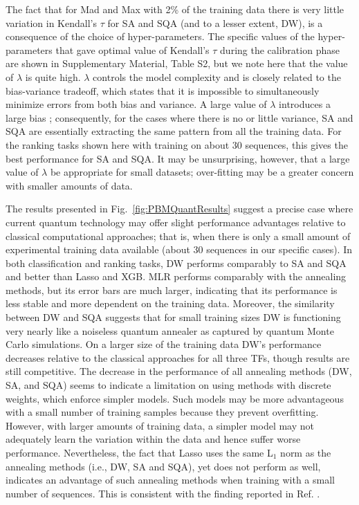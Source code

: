 \documentclass[aps,pra,groupedaddress,nofootinbib,notitlepage,showpacs,floatfix,superscriptaddress]{revtex4-1}
\begin{document}
The fact that for Mad and Max with 2\% of the training data there is very little variation in Kendall's $\tau$ for SA and SQA (and to a lesser extent, DW), is a consequence of the choice of hyper-parameters. The specific values of the hyper-parameters {that gave optimal value of Kendall's $\tau$ during the calibration phase} are shown in Supplementary Material, Table S2, but we note here that the value of $\lambda$ is quite high. $\lambda$ controls the model complexity and is closely related to the bias-variance tradeoff, which states that it is impossible to simultaneously minimize errors from both bias and variance. A large value of $\lambda$ introduces a large bias \cite{Cucker:02}; consequently, for the cases where there is no or little variance, SA and SQA are essentially extracting the same pattern from all the training data. For the ranking tasks shown here with training on about $30$ sequences, this gives the best performance for SA and SQA. It may be unsurprising, however, that a large value of $\lambda$ be appropriate for small datasets; over-fitting may be a greater concern with smaller amounts of data. 

The results presented in Fig.~\ref{fig:PBMQuantResults} suggest a precise case where current quantum technology may offer slight performance advantages relative to classical computational approaches; that is, when there is only a small amount of experimental training data available (about $30$ sequences in our specific cases). In both classification and ranking tasks, DW performs comparably to SA and SQA and better than Lasso and XGB. MLR performs comparably with the annealing methods, but its error bars are much larger, indicating that its performance is less stable and more dependent on the training data. Moreover, the similarity between DW and SQA suggests that for small training sizes DW is functioning very nearly like a noiseless quantum annealer as captured by quantum Monte Carlo simulations. On a larger size of the training data DW's performance decreases relative to the classical approaches for all three TFs, though results are still competitive. The decrease in the performance of all annealing methods (DW, SA, and SQA) seems to indicate a limitation on using methods with discrete weights, which enforce simpler models. Such models may be more advantageous with a small number of training samples because they prevent overfitting. However, with larger amounts of training data, a simpler model may not adequately learn the variation within the data and hence suffer worse performance. Nevertheless, the fact that Lasso uses the same L$_1$ norm as the annealing methods (i.e., DW, SA and SQA), yet does not perform as well, indicates an advantage of such annealing methods when training with a small number of sequences. This is consistent with the finding reported in Ref. \cite{Mott:2017aa}.
 
\end{document}
